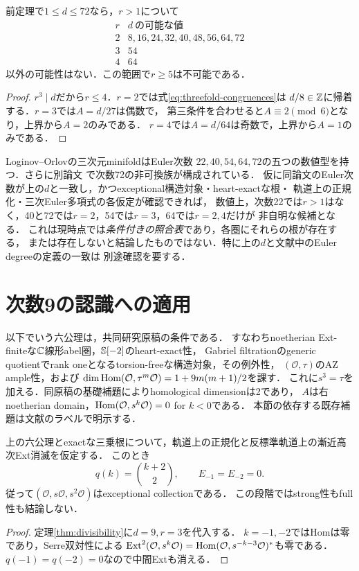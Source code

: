 \documentclass[11pt,a4paper]{ltjsarticle}
\begin{document}
\begin{corollary}\label{cor:threefold-small-degrees}
前定理で$1\le d\le72$なら，$r>1$について
\[
 \begin{array}{c|c}
 r & d\ \text{の可能な値}\\ \hline
 2 & 8,16,24,32,40,48,56,64,72\\
 3 & 54\\
 4 & 64
 \end{array}
\]
以外の可能性はない．この範囲で$r\ge5$は不可能である．
\end{corollary}
\begin{proof}
$r^3\mid d$だから$r\le4$．$r=2$では式\eqref{eq:threefold-congruences}は
$d/8\in\mathbb Z$に帰着する．$r=3$では$A=d/27$は偶数で，
第三条件を合わせると$A\equiv2\pmod6$となり，上界から$A=2$のみである．
$r=4$では$A=d/64$は奇数で，上界から$A=1$のみである．
\end{proof}

\begin{remark}[非可換minifoldとの比較に必要な照合]\label{rem:threefold-minifold}
Loginov--Orlov\cite{LO}の三次元minifoldはEuler次数
$22,40,54,64,72$の五つの数値型を持つ．さらに別論文
\cite{LOM72}で次数72の非可換族が構成されている．
仮に同論文のEuler次数が上の$d$と一致し，かつexceptional構造対象・heart-exactな根・
軌道上の正規化・三次Euler多項式の各仮定が確認できれば，
数値上，次数22では$r>1$はなく，40と72では$r=2$，54では$r=3$，64では$r=2,4$だけが
非自明な候補となる．
これは現時点では\emph{条件付きの照合表}であり，各圏にそれらの根が存在する，
または存在しないと結論したものではない．特に上の$d$と文献中のEuler degreeの定義の一致は
別途確認を要する．
\end{remark}

\section{次数9の認識への適用}
以下でいう六公理は，共同研究原稿\cite[Definition 1.1]{Companion}の条件である．
すなわちnoetherian Ext-finiteな$\mathbb C$線形abel圏，$\mathbb S[-2]$のheart-exact性，
Gabriel filtrationのgeneric quotientでrank oneとなるtorsion-freeな構造対象，その例外性，
$(\mathcal O,\tau)$のAZ ample性，および
$\dim\operatorname{Hom}(\mathcal O,\tau^m\mathcal O)=1+9m(m+1)/2$を課す．
これに$s^3=\tau$を加える．同原稿の基礎補題によりhomological dimensionは2であり，
$A$は右noetherian domain，$\operatorname{Hom}(\mathcal O,s^k\mathcal O)=0$ for $k<0$である．
本節の依存する既存補題は文献\cite{Companion}のラベルで明示する．

\begin{proposition}[最初の障害の消滅]\label{prop:first-obstruction}
上の六公理とexactな三乗根について，軌道上の正規化と反標準軌道上の漸近高次Ext消滅を仮定する．
このとき
\[
 q(k)=\binom{k+2}{2},\qquad E_{-1}=E_{-2}=0.
\]
従って$(\mathcal O,s\mathcal O,s^2\mathcal O)$はexceptional collectionである．
この段階ではstrong性もfull性も結論しない．
\end{proposition}
\begin{proof}
定理\ref{thm:divisibility}に$d=9,r=3$を代入する．
$k=-1,-2$ではHomは零であり，Serre双対性による
$\operatorname{Ext}^2(\mathcal O,s^k\mathcal O)=\operatorname{Hom}(\mathcal O,s^{-k-3}\mathcal O)^*$も零である．
$q(-1)=q(-2)=0$なので中間Extも消える．
\end{proof}
\end{document}

